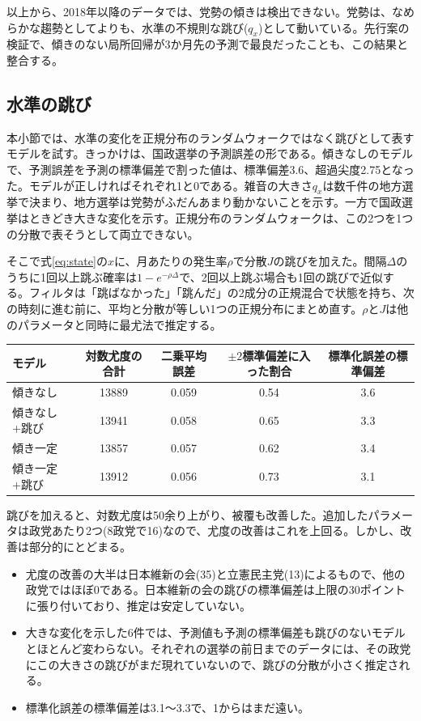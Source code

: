 \documentclass[a4paper,11pt]{ltjsarticle}
\begin{document}
以上から、2018年以降のデータでは、党勢の傾きは検出できない。党勢は、なめらかな趨勢としてよりも、水準の不規則な跳び($q_x$)として動いている。先行案の検証で、傾きのない局所回帰が3か月先の予測で最良だったことも、この結果と整合する。

\subsection{水準の跳び}
\label{sec:jump}

本小節では、水準の変化を正規分布のランダムウォークではなく跳びとして表すモデルを試す。きっかけは、国政選挙の予測誤差の形である。傾きなしのモデルで、予測誤差を予測の標準偏差で割った値は、標準偏差3.6、超過尖度2.75となった。モデルが正しければそれぞれ1と0である。雑音の大きさ$q_x$は数千件の地方選挙で決まり、地方選挙は党勢がふだんあまり動かないことを示す。一方で国政選挙はときどき大きな変化を示す。正規分布のランダムウォークは、この2つを1つの分散で表そうとして両立できない。

そこで式\eqref{eq:state}の$x$に、月あたりの発生率$\rho$で分散$J$の跳びを加えた。間隔$\Delta$のうちに1回以上跳ぶ確率は$1-e^{-\rho\Delta}$で、2回以上跳ぶ場合も1回の跳びで近似する。フィルタは「跳ばなかった」「跳んだ」の2成分の正規混合で状態を持ち、次の時刻に進む前に、平均と分散が等しい1つの正規分布にまとめ直す。$\rho$と$J$は他のパラメータと同時に最尤法で推定する。

\begin{table}[h]
\centering
\begin{tabular}{lcccc}
\hline
モデル & 対数尤度の合計 & 二乗平均誤差 & $\pm2$標準偏差に入った割合 & 標準化誤差の標準偏差 \\
\hline
傾きなし & 13889 & 0.059 & 0.54 & 3.6 \\
傾きなし+跳び & 13941 & 0.058 & 0.65 & 3.3 \\
傾き一定 & 13857 & 0.057 & 0.62 & 3.4 \\
傾き一定+跳び & 13912 & 0.056 & 0.73 & 3.1 \\
\hline
\end{tabular}
\end{table}

跳びを加えると、対数尤度は50余り上がり、被覆も改善した。追加したパラメータは政党あたり2つ(8政党で16)なので、尤度の改善はこれを上回る。しかし、改善は部分的にとどまる。
\begin{itemize}
  \item 尤度の改善の大半は日本維新の会(35)と立憲民主党(13)によるもので、他の政党ではほぼ0である。日本維新の会の跳びの標準偏差は上限の30ポイントに張り付いており、推定は安定していない。
  \item 大きな変化を示した6件では、予測値も予測の標準偏差も跳びのないモデルとほとんど変わらない。それぞれの選挙の前日までのデータには、その政党にこの大きさの跳びがまだ現れていないので、跳びの分散が小さく推定される。
  \item 標準化誤差の標準偏差は3.1〜3.3で、1からはまだ遠い。
\end{itemize}
\end{document}
